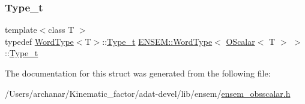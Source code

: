 \subsubsection{\texorpdfstring{Type\_t}{Type\_t}\hspace{0.1cm}{\footnotesize\ttfamily [3/3]}}
{\footnotesize\ttfamily template$<$class T $>$ \\
typedef \mbox{\hyperlink{structENSEM_1_1WordType}{Word\+Type}}$<$T$>$\+::\mbox{\hyperlink{structENSEM_1_1WordType_3_01OScalar_3_01T_01_4_01_4_a8fa9533e78185900519355e6b5dc8ab5}{Type\+\_\+t}} \mbox{\hyperlink{structENSEM_1_1WordType}{E\+N\+S\+E\+M\+::\+Word\+Type}}$<$ \mbox{\hyperlink{classENSEM_1_1OScalar}{O\+Scalar}}$<$ T $>$ $>$\+::\mbox{\hyperlink{structENSEM_1_1WordType_3_01OScalar_3_01T_01_4_01_4_a8fa9533e78185900519355e6b5dc8ab5}{Type\+\_\+t}}}



The documentation for this struct was generated from the following file\+:\begin{DoxyCompactItemize}
\item 
/\+Users/archanar/\+Kinematic\+\_\+factor/adat-\/devel/lib/ensem/\mbox{\hyperlink{adat-devel_2lib_2ensem_2ensem__obsscalar_8h}{ensem\+\_\+obsscalar.\+h}}\end{DoxyCompactItemize}
